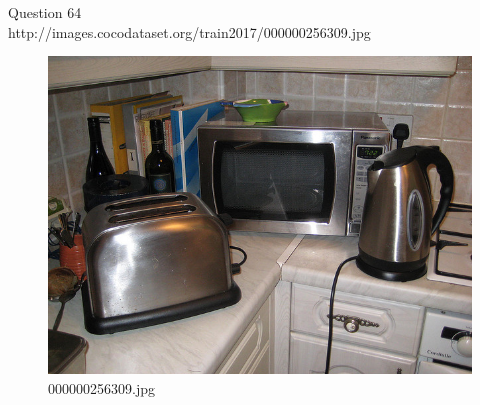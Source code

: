 Question 64\\
http://images.cocodataset.org/train2017/000000256309.jpg
\begin{figure}[h]
    \centering
    \includegraphics[width=0.8\linewidth]{../image set/hard/000000256309.jpg}
    \caption{000000256309.jpg}
\end{figure}
